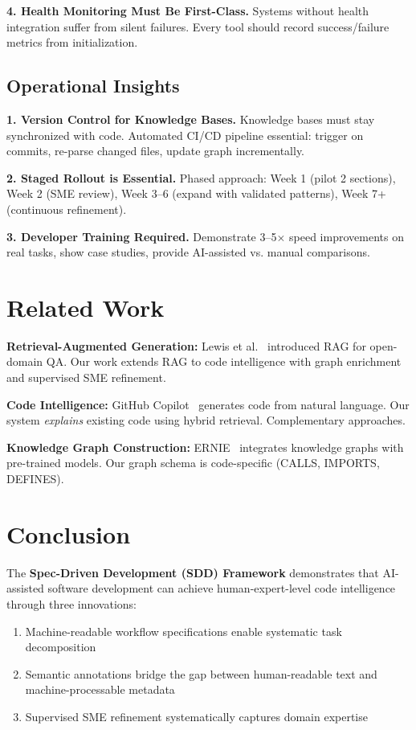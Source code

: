 \documentclass[11pt,letterpaper]{article}
\begin{document}
\textbf{4. Health Monitoring Must Be First-Class.} Systems without health integration suffer from silent failures. Every tool should record success/failure metrics from initialization.

\subsection{Operational Insights}

\textbf{1. Version Control for Knowledge Bases.} Knowledge bases must stay synchronized with code. Automated CI/CD pipeline essential: trigger on commits, re-parse changed files, update graph incrementally.

\textbf{2. Staged Rollout is Essential.} Phased approach: Week 1 (pilot 2 sections), Week 2 (SME review), Week 3--6 (expand with validated patterns), Week 7+ (continuous refinement).

\textbf{3. Developer Training Required.} Demonstrate 3--5$\times$ speed improvements on real tasks, show case studies, provide AI-assisted vs. manual comparisons.

\section{Related Work}

\textbf{Retrieval-Augmented Generation:} Lewis et al.~\cite{lewis2020rag} introduced RAG for open-domain QA. Our work extends RAG to code intelligence with graph enrichment and supervised SME refinement.

\textbf{Code Intelligence:} GitHub Copilot~\cite{chen2021codex} generates code from natural language. Our system \textit{explains} existing code using hybrid retrieval. Complementary approaches.

\textbf{Knowledge Graph Construction:} ERNIE~\cite{zhang2019ernie} integrates knowledge graphs with pre-trained models. Our graph schema is code-specific (CALLS, IMPORTS, DEFINES).

\section{Conclusion}

The \textbf{Spec-Driven Development (SDD) Framework} demonstrates that AI-assisted software development can achieve human-expert-level code intelligence through three innovations:

\begin{enumerate}
    \item Machine-readable workflow specifications enable systematic task decomposition
    \item Semantic annotations bridge the gap between human-readable text and machine-processable metadata
    \item Supervised SME refinement systematically captures domain expertise
\end{enumerate}
\end{document}

